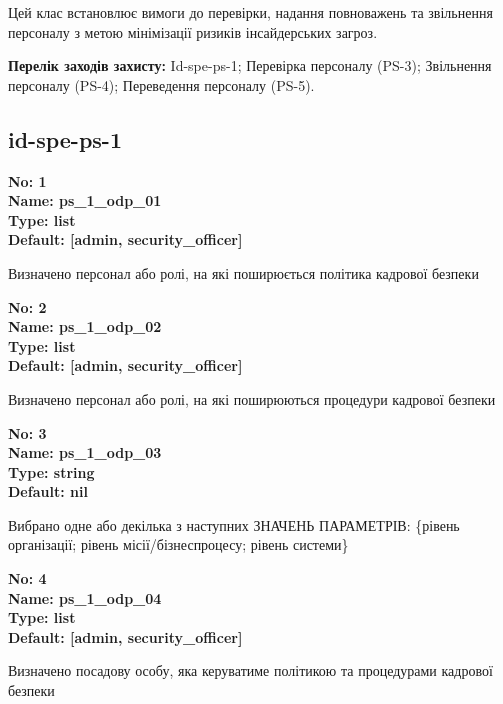 \documentclass{article}
\begin{document}
Цей клас встановлює вимоги до перевірки, надання повноважень та звільнення персоналу з метою мінімізації ризиків інсайдерських загроз.

\textbf{Перелік заходів захисту:} Id-spe-ps-1; Перевірка персоналу (PS-3); Звільнення персоналу (PS-4); Переведення персоналу (PS-5).

\subsection{id-spe-ps-1}


\vspace{10pt}
{\footnotesize\bfseries
No: 1\\
Name: ps\_\allowbreak{}1\_\allowbreak{}odp\_\allowbreak{}01\\
Type: list\\
Default: [\textquotedbl{}admin\textquotedbl{}, \textquotedbl{}security\_\allowbreak{}officer\textquotedbl{}]
}

{\footnotesize Визначено персонал або ролі, на які поширюється політика кадрової безпеки}


{\footnotesize\bfseries
No: 2\\
Name: ps\_\allowbreak{}1\_\allowbreak{}odp\_\allowbreak{}02\\
Type: list\\
Default: [\textquotedbl{}admin\textquotedbl{}, \textquotedbl{}security\_\allowbreak{}officer\textquotedbl{}]
}

{\footnotesize Визначено персонал або ролі, на які поширюються процедури кадрової безпеки}


{\footnotesize\bfseries
No: 3\\
Name: ps\_\allowbreak{}1\_\allowbreak{}odp\_\allowbreak{}03\\
Type: string\\
Default: nil
}

{\footnotesize Вибрано одне або декілька з наступних ЗНАЧЕНЬ ПАРАМЕТРІВ: \{рівень організації; рівень місії/бізнеспроцесу; рівень системи\}}


{\footnotesize\bfseries
No: 4\\
Name: ps\_\allowbreak{}1\_\allowbreak{}odp\_\allowbreak{}04\\
Type: list\\
Default: [\textquotedbl{}admin\textquotedbl{}, \textquotedbl{}security\_\allowbreak{}officer\textquotedbl{}]
}

{\footnotesize Визначено посадову особу, яка керуватиме політикою та процедурами кадрової безпеки}
\end{document}

